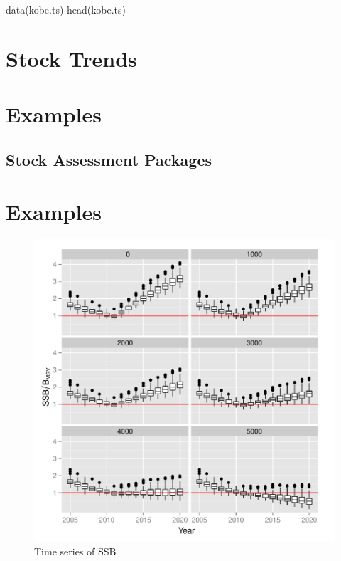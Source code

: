 \documentclass[a4paper, 11pt, oldtoc]{artikel1}
\begin{document}
data(kobe.ts)
head(kobe.ts)

\section{Stock Trends}


\section{Examples}


\subsection{Stock Assessment Packages}

 
\section{Examples}




\begin{figure}
\begin{center}
\includegraphics{kobe-003}
\caption{Time series of SSB}
\end{center}
\end{figure}
\end{document}
